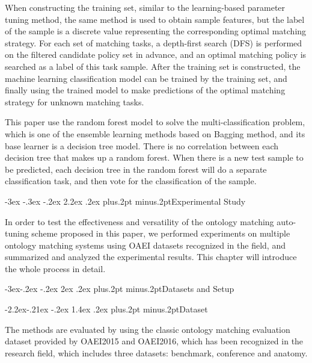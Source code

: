 \documentclass[twoside]{article}
\makeatletter
\def\section{\@startsection{section}{1}{\z@}%
 {-3ex \@plus -.3ex \@minus -.2ex}%
 {2.2ex \@plus.2ex}%
{\normalfont\normalsize\protect\baselineskip=14.5pt plus.2pt minus.2pt\bfseries}}
\def\subsection{\@startsection{subsection}{2}{\z@}%
 {-3ex\@plus -.2ex \@minus -.2ex}%
 {2ex \@plus.2ex}%
{\normalfont\normalsize\protect\baselineskip=12.5pt plus.2pt minus.2pt\bfseries}}
\def\subsubsection{\@startsection{subsubsection}{3}{\z@}%
 {-2.2ex\@plus -.21ex \@minus -.2ex}%
 {1.4ex \@plus.2ex}
{\normalfont\normalsize\protect\baselineskip=12pt plus.2pt minus.2pt\sl}}
\makeatother
\begin{document}
When constructing the training set, similar to the learning-based parameter tuning method, the same method is used to obtain sample features, but the label of the sample is a discrete value representing the corresponding optimal matching strategy.
For each set of matching tasks, a depth-first search (DFS) is performed on the filtered candidate policy set in advance, and an optimal matching policy is searched as a label of this task sample.
After the training set is constructed, the machine learning classification model can be trained by the training set, and finally using the trained model to make predictions of the optimal matching strategy for unknown matching tasks.

This paper use the random forest model to solve the multi-classification problem, which is one of the ensemble learning methods based on Bagging method, and its base learner is a decision tree model.
There is no correlation between each decision tree that makes up a random forest.
When there is a new test sample to be predicted, each decision tree in the random forest will do a separate classification task, and then vote for the classification of the sample.



\section{Experimental Study}

In order to test the effectiveness and versatility of the ontology matching auto-tuning scheme proposed in this paper, we performed experiments on multiple ontology matching systems using OAEI datasets recognized in the field, and summarized and analyzed the experimental results. This chapter will introduce the whole process in detail.

\subsection{Datasets and Setup}

\subsubsection{Dataset}
\label{sec:datasets}

The methods are evaluated by using the classic ontology matching evaluation dataset provided by OAEI2015 and OAEI2016\cite{wwy58}, which has been recognized in the research field, which includes three datasets: benchmark, conference and anatomy.
\end{document}
